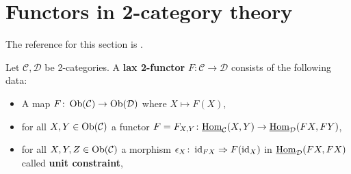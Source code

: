 \section{Functors in 2-category theory}

The reference for this section is \cite[sections 2.2.4-2.2.8]{kerodon}.

\begin{defi}
\label{lax_functor_defi}
	Let $ \mathcal{ C } , \mathcal{ D } $ be 2-categories.
	A \textbf{lax 2-functor} $ F \colon \mathcal{ C } \to \mathcal{ D } $ consists of the following data:
	\begin{itemize}
		\item 
		A map $ F \colon \operatorname{Ob} ( \mathcal{ C } ) \to \operatorname{Ob} ( \mathcal{ D } ) $ where $ X \mapsto F ( X ) $,
		
		\item 
		for all $  X , Y \in \operatorname{Ob} ( \mathcal{ C } ) $ a functor $ F = F_{ X , Y } \colon \underline{ \operatorname{Hom} }_{ \mathcal{ C } } ( X , Y ) \to \underline{ \operatorname{Hom} }_{ \mathcal{ D } } ( F X , F Y ) $,
		
		\item 
		for all $ X , Y , Z \in \operatorname{Ob}( \mathcal{ C } ) $ a morphism $ \epsilon_X \colon \operatorname{id}_{ F X } \Rightarrow F ( \operatorname{id}_X ) $ in $ \underline{ \operatorname{Hom} }_{ \mathcal{ D } } ( F X , F X ) $ called \textbf{unit constraint},
		

\end{itemize}
\end{defi}
